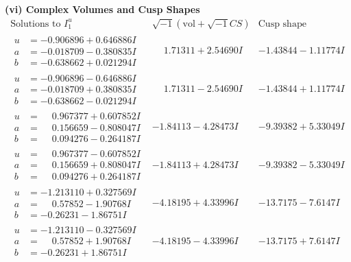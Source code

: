 \documentclass[1p]{elsarticle_modified}
\theoremstyle{definition}
\newcommand{\I}{\sqrt{-1}}
\begin{document}
\newpage\flushleft \textbf{(vi) Complex Volumes and Cusp Shapes}
$$\begin{array}{c|c|c}  
\text{Solutions to }I^u_{1}& \I (\text{vol} + \sqrt{-1}CS) & \text{Cusp shape}\\
 \hline 
\begin{aligned}
u &= -0.906896 + 0.646886 I \\
a &= -0.018709 - 0.380835 I \\
b &= -0.638662 + 0.021294 I\end{aligned}
 & \phantom{-}1.71311 + 2.54690 I & -1.43844 - 1.11774 I \\ \hline\begin{aligned}
u &= -0.906896 - 0.646886 I \\
a &= -0.018709 + 0.380835 I \\
b &= -0.638662 - 0.021294 I\end{aligned}
 & \phantom{-}1.71311 - 2.54690 I & -1.43844 + 1.11774 I \\ \hline\begin{aligned}
u &= \phantom{-}0.967377 + 0.607852 I \\
a &= \phantom{-}0.156659 - 0.808047 I \\
b &= \phantom{-}0.094276 - 0.264187 I\end{aligned}
 & -1.84113 - 4.28473 I & -9.39382 + 5.33049 I \\ \hline\begin{aligned}
u &= \phantom{-}0.967377 - 0.607852 I \\
a &= \phantom{-}0.156659 + 0.808047 I \\
b &= \phantom{-}0.094276 + 0.264187 I\end{aligned}
 & -1.84113 + 4.28473 I & -9.39382 - 5.33049 I \\ \hline\begin{aligned}
u &= -1.213110 + 0.327569 I \\
a &= \phantom{-}0.57852 - 1.90768 I \\
b &= -0.26231 - 1.86751 I\end{aligned}
 & -4.18195 + 4.33996 I & -13.7175 - 7.6147 I \\ \hline\begin{aligned}
u &= -1.213110 - 0.327569 I \\
a &= \phantom{-}0.57852 + 1.90768 I \\
b &= -0.26231 + 1.86751 I\end{aligned}
 & -4.18195 - 4.33996 I & -13.7175 + 7.6147 I \\ \hline\begin{aligned}

\end{aligned}
\end{array}$$
\end{document}
